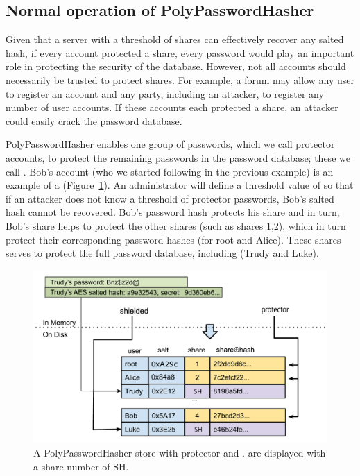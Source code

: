 \subsection{Normal operation of PolyPasswordHasher}
\label{SUBSEC:normal-operation}

Given that a server with a threshold of shares can effectively recover any
salted hash, if every account protected a share, every password would play an
important role in protecting the security of the database.  However, not all
accounts should necessarily be trusted to protect shares.  For example, a forum
may allow any user to register an account and any party, including an attacker,
to register any number of user accounts.  If these accounts each protected a
share, an attacker could easily crack the password database.

PolyPasswordHasher enables one group of passwords, which we call protector
accounts, to protect the remaining passwords in the password database; these we
call \thresholdlessaccounts.  Bob's account (who we started following in the
previous example) is an example of a \thresholdaccount
(Figure~\ref{FIGURE:protected-protector}).  An administrator will define a
threshold value of \thresholdaccounts so that if an attacker does not know a
threshold of protector passwords, Bob's salted hash cannot be recovered.  Bob's
password hash protects his share and in turn, Bob's share helps to protect the
other shares (such as shares 1,2), which in turn protect their corresponding
password hashes (for root and Alice). These shares serves to protect the full
password database, including \thresholdlessaccounts (Trudy and Luke). 

\begin{figure}
    \includegraphics[width=1\linewidth]{./images/pph-store.pdf}
    \caption{A PolyPasswordHasher store with protector and \thresholdlessaccounts. \Thresholdlessaccounts are displayed with a share number of SH. }
    \label{FIGURE:protected-protector}
\end{figure}

